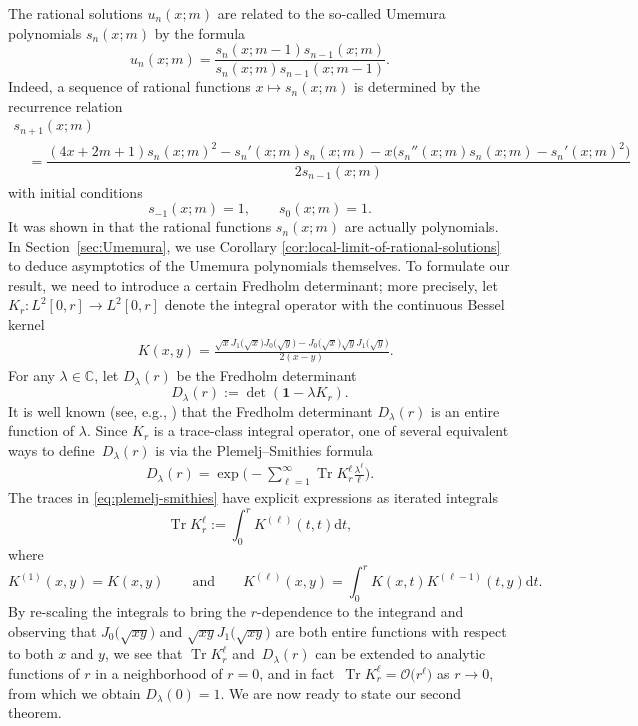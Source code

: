 \documentclass[11pt]{article}
\numberwithin{equation}{section}
\numberwithin{equation}{section}
\newcommand{\dd}{\mathrm{d}}
\newcommand\lb{\left(}
\newcommand\rb{\right)}
\newcommand{\Tr}{\operatorname{Tr}}
\begin{document}
The rational solutions $u_n(x;m)$ are related to the so-called Umemura polynomials $s_n(x;m)$ by the formula
\begin{equation}
u_n(x;m)=\dfrac{s_n(x;m-1)s_{n-1}(x;m)}{s_n(x;m)s_{n-1}(x;m-1)}.
\label{eq:un-polys}
\end{equation}
Indeed, a sequence of rational functions $x\mapsto s_n(x;m)$ is determined by the recurrence relation
\begin{gather}
s_{n+1}(x;m)\nonumber\\
\quad=\dfrac{(4x+2m+1)s_n(x;m)^2-s_n'(x;m)s_n(x;m)-x\big(s_n''(x;m)s_n(x;m)-s_n'(x;m)^2\big)}{2s_{n-1}(x;m)}
\label{eq:umemura-recurrence}
\end{gather}
with initial conditions
\begin{equation}\label{eq:umemura-recurrence_init}
s_{-1}(x;m)=1,\qquad s_{0}(x;m)=1.
\end{equation}
It was shown in \cite{clarkson2018constructive,Umemura} that the rational functions $s_n(x;m)$ are actually polynomials. In Section~\ref{sec:Umemura}, we use Corollary \ref{cor:local-limit-of-rational-solutions} to deduce asymptotics of the Umemura polynomials themselves. To formulate our result, we need to introduce a certain Fredholm determinant; more precisely, let $K_r\colon L^2[0, r] \to L^2[0, r]$ denote the integral operator with the continuous Bessel kernel
 	\begin{align*}
 	&K(x,y)=\frac{\sqrt{x}J_1\big( \sqrt x\big) J_0\big(\sqrt y\big)-
 	 J_0\big(\sqrt x\big) \sqrt{y}J_1\big( \sqrt y\big)}{2( x-y)}.
 	\end{align*}
For any $\lambda\in\mathbb C$, let $D_\lambda( r)$ be the Fredholm determinant
\[%
 	D_\lambda( r) :=\det ( \mathbf 1-\lambda K_r).
\]
It is well known (see, e.g., \cite[Chapter 24]{Lax}) that the Fredholm determinant $D_\lambda( r)$ is an entire function of $\lambda$. Since $K_r$ is a trace-class integral operator, one of several equivalent ways to define~$D_\lambda\lb r\rb$ is via the Plemelj--Smithies formula
 \begin{gather}
 D_\lambda( r)=\exp\biggl(-\sum_{\ell=1}^\infty \Tr K_r^{\ell} \frac{\lambda^\ell}{\ell}\biggr).
 \label{eq:plemelj-smithies}
 \end{gather}
The traces in \eqref{eq:plemelj-smithies} have explicit expressions as iterated integrals
\[
\Tr K_r^\ell := \int_0^r K^{(\ell)}(t, t) \dd t,
\]
where
\[
K^{(1)}(x, y) = K(x, y) \qquad \text{and} \qquad K^{(\ell)}(x, y) = \int_0^r K(x, t) K^{(\ell - 1)}(t, y) \dd t.
\]
By re-scaling the integrals to bring the $r$-dependence to the integrand and observing that $J_0 \big( \sqrt{xy} \big)$ and $\sqrt{xy}J_1\big(\sqrt{xy}\big)$ are both entire functions with respect to both $x$ and $y$, we see that $\Tr K_r^{\ell}$ and~$D_\lambda ( r)$ can be extended to analytic functions of $r$ in a neighborhood of $r=0$, and in fact~$\Tr K_r^{\ell}=\mathcal{O}\big(r^\ell\big)$ as $r\to 0$, from which we obtain $D_\lambda(0)=1$. We are now ready to state our second theorem.
\end{document}
